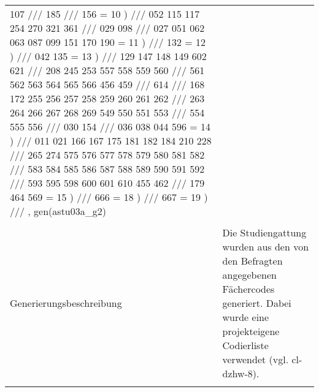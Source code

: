 \begin{tabular}{lL{11.3cm}}
107          ///
185          ///
156 = 10 )         ///
052 115 117 254 270 321 361    ///
029 098         ///
027 051 062 063 087 099 151 170 190 = 11 ) ///
132 = 12 )         ///
042 135 = 13 )        ///
129 147 148 149 602 621     ///
208 245 253 557 558 559 560    ///
561 562 563 564 565 566 456 459   ///
614          ///
168 172 255 256 257 258 259 260 261 262 ///
263 264 266 267 268 269 549 550 551 553 ///
554 555 556        ///
030 154         ///
036 038 044 596 = 14 )      ///
011 021 166 167 175 181 182 184 210 228 ///
265 274 575 576 577 578 579 580 581 582 ///
583 584 585 586 587 588 589 590 591 592 ///
593 595 598 600 601 610 455 462   ///
179 464 569 = 15 )       ///
666 = 18 )          ///
667 = 19 )          ///
, gen(astu03a\_g2)
 \\
				 \\
					Generierungsbeschreibung & Die Studiengattung wurden aus den von den Befragten angegebenen Fächercodes generiert.  Dabei wurde eine projekteigene Codierliste verwendet (vgl. cl-dzhw-8).
				 \\	
			 \\
		\end{tabular}






